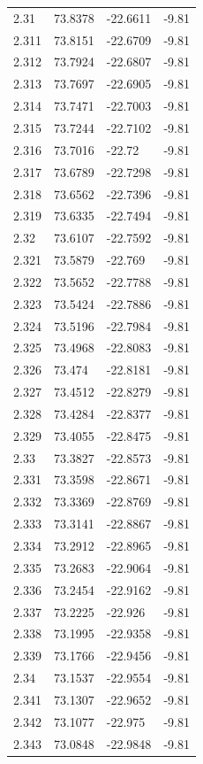 \begin{tabular}{llll}
2.31 & 73.8378 & -22.6611 & -9.81 \\
2.311 & 73.8151 & -22.6709 & -9.81 \\
2.312 & 73.7924 & -22.6807 & -9.81 \\
2.313 & 73.7697 & -22.6905 & -9.81 \\
2.314 & 73.7471 & -22.7003 & -9.81 \\
2.315 & 73.7244 & -22.7102 & -9.81 \\
2.316 & 73.7016 & -22.72 & -9.81 \\
2.317 & 73.6789 & -22.7298 & -9.81 \\
2.318 & 73.6562 & -22.7396 & -9.81 \\
2.319 & 73.6335 & -22.7494 & -9.81 \\
2.32 & 73.6107 & -22.7592 & -9.81 \\
2.321 & 73.5879 & -22.769 & -9.81 \\
2.322 & 73.5652 & -22.7788 & -9.81 \\
2.323 & 73.5424 & -22.7886 & -9.81 \\
2.324 & 73.5196 & -22.7984 & -9.81 \\
2.325 & 73.4968 & -22.8083 & -9.81 \\
2.326 & 73.474 & -22.8181 & -9.81 \\
2.327 & 73.4512 & -22.8279 & -9.81 \\
2.328 & 73.4284 & -22.8377 & -9.81 \\
2.329 & 73.4055 & -22.8475 & -9.81 \\
2.33 & 73.3827 & -22.8573 & -9.81 \\
2.331 & 73.3598 & -22.8671 & -9.81 \\
2.332 & 73.3369 & -22.8769 & -9.81 \\
2.333 & 73.3141 & -22.8867 & -9.81 \\
2.334 & 73.2912 & -22.8965 & -9.81 \\
2.335 & 73.2683 & -22.9064 & -9.81 \\
2.336 & 73.2454 & -22.9162 & -9.81 \\
2.337 & 73.2225 & -22.926 & -9.81 \\
2.338 & 73.1995 & -22.9358 & -9.81 \\
2.339 & 73.1766 & -22.9456 & -9.81 \\
2.34 & 73.1537 & -22.9554 & -9.81 \\
2.341 & 73.1307 & -22.9652 & -9.81 \\
2.342 & 73.1077 & -22.975 & -9.81 \\
2.343 & 73.0848 & -22.9848 & -9.81 \\

\end{tabular}
